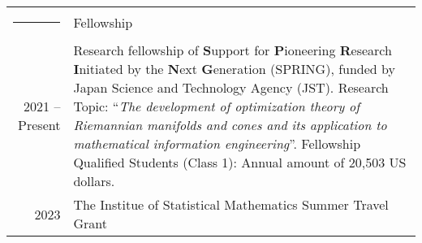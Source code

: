 \documentclass[letterpaper,10pt]{article}
\newcommand{\headingfont}{\LARGE }
\newenvironment{SectionTable}[1]{
	\renewcommand*{\arraystretch}{1.0}
	\setlength{\tabcolsep}{10pt}
	\begin{longtable}{Rp{5.2in}} 
		\rule{2.5cm}{4pt} 
		& #1 \\ %
	}
	{
	\end{longtable}\vspace{-.3cm}
}
\begin{document}
\begin{SectionTable}{\headingfont Fellowship}
	2021 -- Present &
	Research fellowship of 
	{\textbf{S}upport for \textbf{P}ioneering \textbf{R}esearch \textbf{I}nitiated by the \textbf{N}ext \textbf{G}eneration} (SPRING), funded by Japan Science and Technology Agency (JST). \newline
	Research Topic: ``\textit{The development of optimization theory of Riemannian manifolds and cones and its application to mathematical information engineering}''. \newline
	Fellowship Qualified Students (Class 1):
	Annual amount of 20,503 US dollars. \\
	
	2023 & The Institue of Statistical Mathematics Summer Travel Grant
\end{SectionTable}


\end{document}
